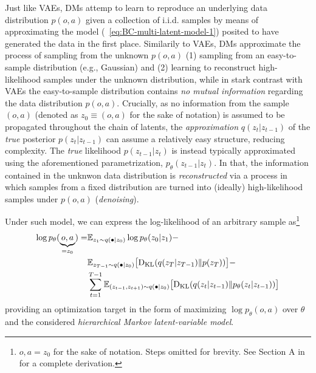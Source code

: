 Just like VAEs, DMs attemp to learn to reproduce an underlying data distribution \( p (o,a) \) given a collection of i.i.d. samples by means of approximating the model (~\ref{eq:BC-multi-latent-model-1}) posited to have generated the data in the first place.
Similarily to VAEs, DMs approximate the process of sampling from the unknown \( p(o,a) \) (1) sampling from an easy-to-sample distribution (e.g., Gaussian) and (2) learning to reconstruct high-likelihood samples under the unknown distribution, while in stark contrast with VAEs the easy-to-sample distribution contains \emph{no mutual information} regarding the data distribution \( p(o,a) \).
Crucially, as no information from the sample \( (o,a) \) (denoted as \( z_0 \equiv (o,a) \) for the sake of notation) is assumed to be propagated throughout the chain of latents, the \emph{approximation} \( q(z_t \vert z_{t-1} ) \) of the \emph{true} posterior \( p(z_t \vert z_{t-1})\) can assume a relatively easy structure, reducing complexity.
The \emph{true} likelihood \( p(z_{t-1} \vert z_t) \) is instead typically approximated using the aforementioned parametrization, \(  p_\theta (z_{t-1} \vert z_t) \).
In that, the information contained in the unknwon data distribution is \emph{reconstructed} via a process in which samples from a fixed distribution are turned into (ideally) high-likelihood samples under \( p(o,a) \) (\emph{denoising}).

Under such model, we can express the log-likelihood of an arbitrary sample as\footnote{\( o,a = z_0 \) for the sake of notation. Steps omitted for brevity. See Section A in~\citet{hoDenoisingDiffusionProbabilistic2020} for a complete derivation.
}
\begin{align}
    \log p_\theta (\underbrace{o,a}_{= z_0}) = 
    &\mathbb{E}_{z_1 \sim q(\bullet \vert z_0)} \log p_\theta (z_0 \vert z_1) - \label{eq:diffusion-likelihood} \\
    &\mathbb{E}_{z_{T-1} \sim q(\bullet \vert z_0)} \big[ \text{D}_{\text{KL}} (q(z_T \vert z_{T-1}) \Vert p(z_T) ) \big] - \notag \\ 
    &\sum_{t=1}^{T-1} \mathbb{E}_{(z_{t-1}, z_{t+1}) \sim q(\bullet \vert z_0)} \big[ \text{D}_{\text{KL}} (q(z_t \vert z_{t-1}) \Vert p_\theta(z_t \vert z_{t-1}) ) \big] \notag
\end{align}
providing an optimization target in the form of maximizing \( \log p_\theta(o,a) \) over \( \theta \) and the considered \emph{hierarchical Markov latent-variable model}.


